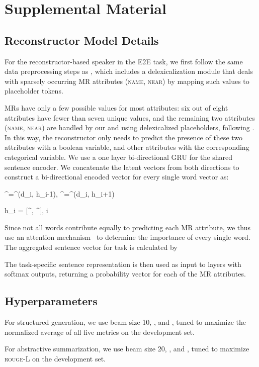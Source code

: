 \documentclass[11pt,a4paper]{article}
\newcommand{\basespk}[0]{\xspace}
\newcommand{\pragd}[0]{\xspace}
\newcommand{\rouge}{\textsc{rouge}\xspace}
\begin{document}



\appendix



\clearpage


\section{Supplemental Material}
\label{sec:supplemental}
\subsection{Reconstructor Model Details}
\label{sec:appendix_reconstructor}
 For the reconstructor-based speaker in the E2E task, we first follow the same data preprocessing steps as \citet{puzikov2018e2e}, which includes a delexicalization module that deals with sparsely occurring MR attributes (\textsc{name}, \textsc{near}) by mapping such values to placeholder tokens.
 
MRs have only a few possible values for most attributes: six out of eight attributes have fewer than seven unique values, and the remaining two attributes (\textsc{name}, \textsc{near}) are handled by our \basespk and \pragd using delexicalized placeholders, following \citet{puzikov2018e2e}.
In this way, the reconstructor only needs to predict the presence of these two attributes with a boolean variable, and other attributes with the corresponding categorical variable. We use a one layer bi-directional GRU \cite{cho2014gru} for the shared sentence encoder. We concatenate the latent vectors from both directions to construct a bi-directional encoded vector  for every single word vector  as:

\limits ^{\rightarrow}=\limits ^{\longrightarrow}(d_i, h_{i-1}), 
\limits ^{\leftarrow}=\limits ^{\longleftarrow}(d_i, h_{i+1})

h_i = [\limits ^{\rightarrow}, \limits ^{\leftarrow}], i \in [1,L]

Since not all words contribute equally to predicting each MR attribute, we thus use an attention mechanism~\cite{bahdanau2014neural} to determine the importance of every single word. The aggregated sentence vector for task  is calculated by

The task-specific sentence representation is then used as input to  layers with softmax outputs, returning a probability vector  for each of the  MR attributes. 

\subsection{Hyperparameters}
\label{sec:appendix_hyperparameters}
For structured generation, we use beam size 10, , and  , tuned to maximize the normalized average of all five metrics on the development set.

For abstractive summarization, we use beam size 20, , and  , tuned to maximize \rouge-L on the development set.

 
\end{document}
